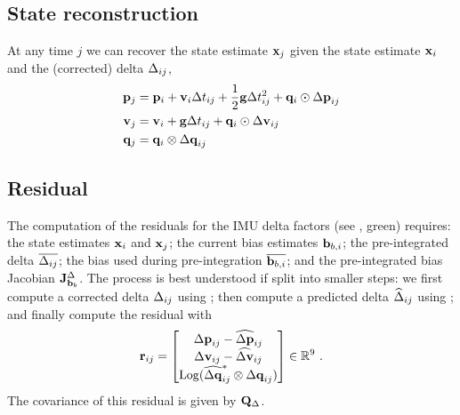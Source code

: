 \subsection{State reconstruction}

At any time $j$ we can recover the state estimate ${\bf x}_j$ given the state estimate ${\bf x}_i$ and the (corrected) delta $\Delta_{ij}$,
%
\begin{align} \label{equ:reconstruction}
\begin{split}
{\bf p}_j &= {\bf p}_i + {\bf v}_i\Delta t_{ij} + \frac12{\bf g}\Delta t_{ij}^2 + {\bf q}_i\odot{\Delta{\bf p}}_{ij} \\
{\bf v}_j &= {\bf v}_i + {\bf g}\Delta t_{ij} + {\bf q}_i\odot{\Delta{\bf v}}_{ij} \\
{\bf q}_j &= {\bf q}_i\otimes{\Delta{\bf q}}_{ij}   
\end{split}
\end{align}



\subsection{Residual}

The computation of the residuals for the IMU delta factors (see , green) requires: the state estimates ${\bf x}_i$ and ${\bf x}_j$; the current bias estimates ${\bf b}_{b,i}$; the pre-integrated delta $\overline{\Delta_{ij}}$; the bias used during pre-integration $\overline{{\bf b}_{b,i}}$; and the pre-integrated bias Jacobian ${{\bf J}^{\Delta}_{{\bf b}_b}}$. The process is best understood if split into smaller steps: we first compute a corrected delta $\Delta_{ij}$ using ; then compute a predicted delta $\widehat{\Delta}_{ij}$ using ; and finally compute the residual with
%
\begin{align}
{\bf r}_{ij} 
= \begin{bmatrix}
{\Delta{\bf p}}_{ij}-\widehat{{\Delta{\bf p}}}_{ij} \\
{\Delta{\bf v}}_{ij}-\widehat{{\Delta{\bf v}}}_{ij} \\
\operatorname*{Log}(\widehat{{\Delta{\bf q}}}_{ij}^*\otimes{\Delta{\bf q}}_{ij})
\end{bmatrix} 
\in {\mathbb R}^9
~.
\end{align}
%
The covariance of this residual is given by ${\bf Q}_\Delta$.



